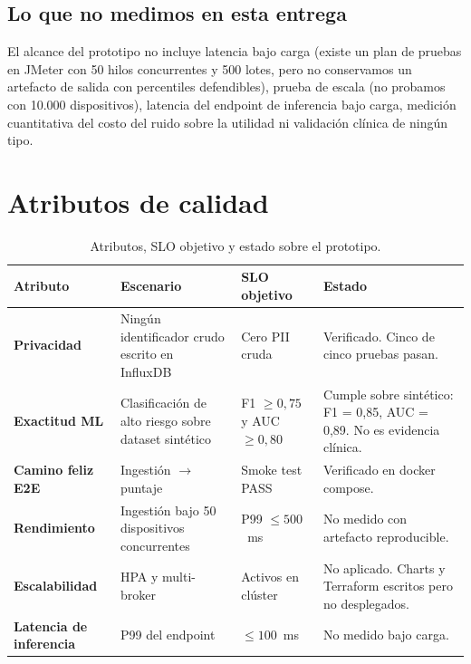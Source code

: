 \documentclass[conference]{IEEEtran}
\begin{document}
\subsection{Lo que no medimos en esta entrega}

El alcance del prototipo no incluye latencia bajo carga (existe un 
plan de pruebas en JMeter con 50 hilos concurrentes y 500 lotes, 
pero no conservamos un artefacto de salida con percentiles 
defendibles), prueba de escala (no probamos con 10.000 
dispositivos), latencia del endpoint de inferencia bajo carga, 
medición cuantitativa del costo del ruido sobre la utilidad ni 
validación clínica de ningún tipo.

\FloatBarrier
\section{Atributos de calidad}\label{sec:calidad}

\begin{table}[t]
  \centering
  \small
  \caption{Atributos, SLO objetivo y estado sobre el prototipo.}
  \label{tab:slos}
  \begin{tabularx}{\textwidth}{@{}>{\bfseries}p{2.6cm} p{4cm} p{3.5cm} X@{}}
    \toprule
    Atributo & Escenario & SLO objetivo & Estado \\
    \midrule
    Privacidad &
      Ningún identificador crudo escrito en InfluxDB &
      Cero PII cruda &
      Verificado. Cinco de cinco pruebas pasan. \\
    \addlinespace
    Exactitud ML &
      Clasificación de alto riesgo sobre dataset sintético &
      F1 $\geq 0{,}75$ y AUC $\geq 0{,}80$ &
      Cumple sobre sintético: F1 = 0,85, AUC = 0,89. No
      es evidencia clínica. \\
    \addlinespace
    Camino feliz E2E &
      Ingestión $\rightarrow$ puntaje &
      Smoke test PASS &
      Verificado en docker compose. \\
    \addlinespace
    Rendimiento &
      Ingestión bajo 50 dispositivos concurrentes &
      P99 $\leq 500$~ms &
      No medido con artefacto reproducible. \\
    \addlinespace
    Escalabilidad &
      HPA y multi-broker &
      Activos en clúster &
      No aplicado. Charts y Terraform escritos pero no
      desplegados. \\
    \addlinespace
    Latencia de inferencia &
      P99 del endpoint &
      $\leq 100$~ms &
      No medido bajo carga. \\
    \bottomrule
  \end{tabularx}
\end{table}
\end{document}
